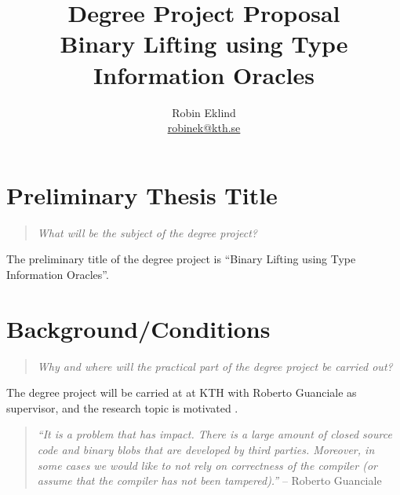 \documentclass[12pt, a4paper]{article}
\title{Degree Project Proposal \\ \Large Binary Lifting using Type Information Oracles}
\author{Robin Eklind \\ \url{robinek@kth.se}}
\begin{document}



\maketitle

\clearpage


\tableofcontents

\clearpage



\section{Preliminary Thesis Title}

\begin{quote}
	\textit{What will be the subject of the degree project?}
\end{quote}

The preliminary title of the degree project is ``Binary Lifting using Type Information Oracles''.

\section{Background/Conditions}

\begin{quote}
	\textit{Why and where will the practical part of the degree project be carried out?}
\end{quote}

The degree project will be carried at at KTH with Roberto Guanciale as supervisor, and the research topic is motivated .

\begin{quote}
	\textit{``It is a problem that has impact. There is a large amount of closed source code and binary blobs that are developed by third parties. Moreover, in some cases we would like to not rely on correctness of the compiler (or assume that the compiler has not been tampered).''} -- Roberto Guanciale
\end{quote}
\end{document}
